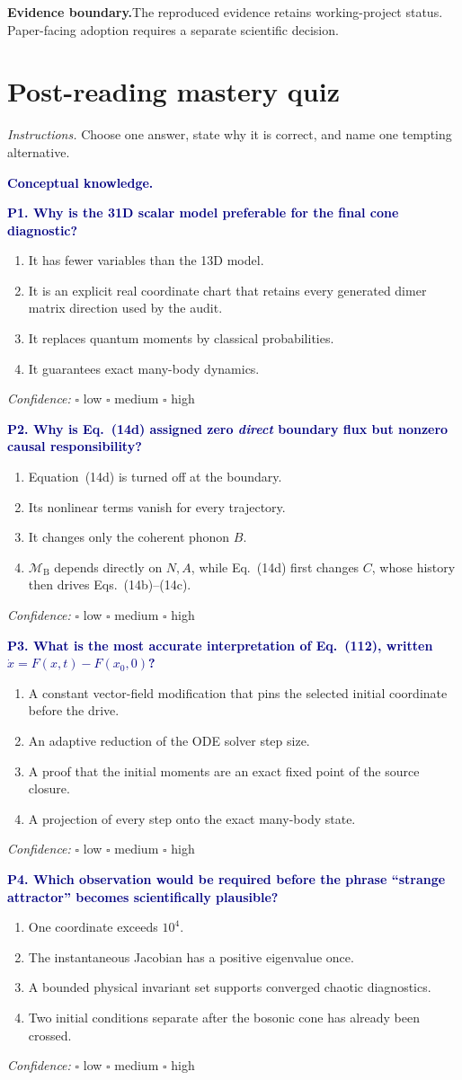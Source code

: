 \documentclass[10pt]{article}
\newcommand{\MB}{\mathcal M_{\mathrm B}}
\newcommand{\warningbox}[1]{%
  \par\medskip
  \noindent\colorbox{palered}{%
    \parbox{\dimexpr\linewidth-2\fboxsep\relax}{%
      \textcolor{brick}{\textbf{Evidence boundary.}}\quad #1%
    }%
  }\par\medskip
}
\newcommand{\flowlead}[1]{%
  \par\medskip
  \needspace{3\baselineskip}%
  \noindent\textcolor{navy}{\textbf{#1.}}\enspace\ignorespaces
}
\newcommand{\choiceblock}[4]{%
  \begin{enumerate}[label=\Alph*.,leftmargin=1.75em]
    \item #1
    \item #2
    \item #3
    \item #4
  \end{enumerate}
}
\newcommand{\confidence}{%
  \noindent\textit{Confidence:}\quad
  \(\square\) low \quad \(\square\) medium \quad \(\square\) high
}
\newcommand{\qhead}[2]{%
  \needspace{8\baselineskip}
  \par\medskip\noindent\textcolor{navy}{\textbf{#1. #2}}\par
}
\begin{document}
\warningbox{The reproduced evidence retains working-project status.
Paper-facing adoption requires a separate scientific decision.}

\part*{Post-reading mastery quiz}

\textit{Instructions.} Choose one answer, state why it is correct, and name
one tempting alternative.


\flowlead{Conceptual knowledge}

\qhead{P1}{Why is the 31D scalar model preferable for the final cone
diagnostic?}
\choiceblock
{It has fewer variables than the 13D model.}
{It is an explicit real coordinate chart that retains every generated dimer
matrix direction used by the audit.}
{It replaces quantum moments by classical probabilities.}
{It guarantees exact many-body dynamics.}
\confidence

\qhead{P2}{Why is Eq.~(14d) assigned zero \emph{direct} boundary flux but
nonzero causal responsibility?}
\choiceblock
{Equation~(14d) is turned off at the boundary.}
{Its nonlinear terms vanish for every trajectory.}
{It changes only the coherent phonon \(B\).}
{\(\MB\) depends directly on \(N,A\), while Eq.~(14d) first changes \(C\),
whose history then drives Eqs.~(14b)--(14c).}
\confidence

\qhead{P3}{What is the most accurate interpretation of Eq.~(112), written
\(\dot x=F(x,t)-F(x_0,0)\)?}
\choiceblock
{A constant vector-field modification that pins the selected initial
coordinate before the drive.}
{An adaptive reduction of the ODE solver step size.}
{A proof that the initial moments are an exact fixed point of the source
closure.}
{A projection of every step onto the exact many-body state.}
\confidence

\qhead{P4}{Which observation would be required before the phrase ``strange
attractor'' becomes scientifically plausible?}
\choiceblock
{One coordinate exceeds \(10^4\).}
{The instantaneous Jacobian has a positive eigenvalue once.}
{A bounded physical invariant set supports converged chaotic diagnostics.}
{Two initial conditions separate after the bosonic cone has already been
crossed.}
\confidence
\end{document}

